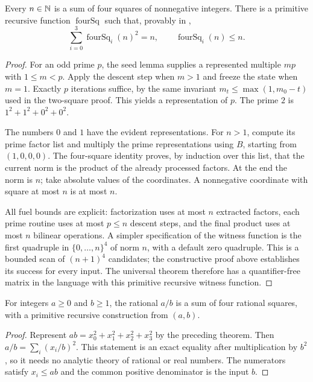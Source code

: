 \begin{theorem}\label{qr:four-squares}
Every $n\in\mathbb N$ is a sum of four squares of nonnegative integers.
There is a primitive recursive function $\operatorname{fourSq}$ such
that, provably in \ipra,
\[
 \sum_{i=0}^3\operatorname{fourSq}_i(n)^2=n,
 \qquad \operatorname{fourSq}_i(n)\le n.
\]
\end{theorem}
\begin{proof}
For an odd prime $p$, the seed lemma supplies a represented multiple
$mp$ with $1\le m<p$. Apply the descent step when $m>1$ and
freeze the state when $m=1$. Exactly $p$ iterations suffice, by the
same invariant $m_t\le\max(1,m_0-t)$ used in the two-square proof.
This yields a representation of $p$. The prime $2$ is
$1^2+1^2+0^2+0^2$.

The numbers $0$ and $1$ have the evident representations. For $n>1$,
compute its prime factor list and multiply the prime representations
using $B$, starting from $(1,0,0,0)$. The four-square identity proves,
by induction over this list, that the current norm is the product of
the already processed factors. At the end the norm is $n$; take
absolute values of the coordinates. A nonnegative coordinate with
square at most $n$ is at most $n$.

All fuel bounds are explicit: factorization uses at most $n$ extracted
factors, each prime routine uses at most $p\le n$ descent steps,
and the final product uses at most $n$ bilinear operations. A simpler
specification of the witness function is the first quadruple in
$\{0,\ldots,n\}^4$ of norm $n$, with a default zero quadruple.
This is a bounded scan of $(n+1)^4$ candidates; the constructive proof
above establishes its success for every input. The universal theorem
therefore has a quantifier-free matrix in the language with this
primitive recursive witness function.
\end{proof}

\begin{corollary}
\label{qr:rational-four}
For integers $a\ge0$ and $b\ge1$, the rational $a/b$ is a sum of
four rational squares, with a primitive recursive construction from
$(a,b)$.
\end{corollary}
\begin{proof}
Represent $ab=x_0^2+x_1^2+x_2^2+x_3^2$ by the preceding theorem.
Then $a/b=\sum_i(x_i/b)^2$. This statement is an exact equality
after multiplication by $b^2$, so it needs no analytic theory of
rational or real numbers. The numerators satisfy $x_i\le ab$ and
the common positive denominator is the input $b$.
\end{proof}

